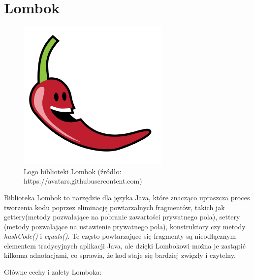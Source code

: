 \section{Lombok}
\begin{figure}[h]
    \centering
    \includegraphics[width=0.4\linewidth]{./img/lombok.png}
    \caption{Logo biblioteki Lombok (źródło: https://avatars.githubusercontent.com)}
    \label{fig:Lombok}
\end{figure}
Biblioteka Lombok to narzędzie dla języka Java, które znacząco upraszcza proces tworzenia kodu poprzez eliminację powtarzalnych fragmentów, takich jak gettery(metody pozwalające na pobranie zawartości prywatnego pola), settery (metody pozwalające na ustawienie prywatnego pola), konstruktory czy metody \textit{hashCode()} i \textit{equals()}. Te często powtarzające się fragmenty są nieodłącznym elementem tradycyjnych aplikacji Java, ale dzięki Lombokowi można je zastąpić kilkoma adnotacjami, co sprawia, że kod staje się bardziej zwięzły i czytelny.

Główne cechy i zalety Lomboka:

